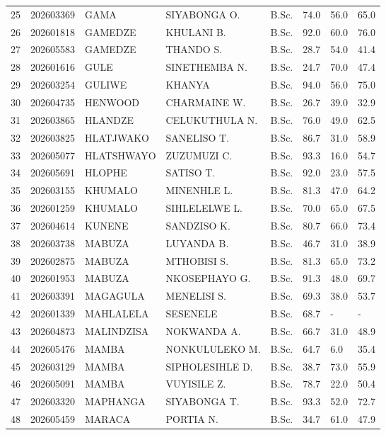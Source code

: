\documentclass[12pt]{article}
\begin{document}
\begin{longtable}{@{}llllllll@{}}
25 & 202603369 & GAMA & SIYABONGA O. & B.Sc. & 74.0 & 56.0 & 65.0 \\
26 & 202601818 & GAMEDZE & KHULANI B. & B.Sc. & 92.0 & 60.0 & 76.0 \\
27 & 202605583 & GAMEDZE & THANDO S. & B.Sc. & 28.7 & 54.0 & 41.4 \\
28 & 202601616 & GULE & SINETHEMBA N. & B.Sc. & 24.7 & 70.0 & 47.4 \\
29 & 202603254 & GULIWE & KHANYA & B.Sc. & 94.0 & 56.0 & 75.0 \\
30 & 202604735 & HENWOOD & CHARMAINE W. & B.Sc. & 26.7 & 39.0 & 32.9 \\
31 & 202603865 & HLANDZE & CELUKUTHULA N. & B.Sc. & 76.0 & 49.0 & 62.5 \\
32 & 202603825 & HLATJWAKO & SANELISO T. & B.Sc. & 86.7 & 31.0 & 58.9 \\
33 & 202605077 & HLATSHWAYO & ZUZUMUZI C. & B.Sc. & 93.3 & 16.0 & 54.7 \\
34 & 202605691 & HLOPHE & SATISO T. & B.Sc. & 92.0 & 23.0 & 57.5 \\
35 & 202603155 & KHUMALO & MINENHLE L. & B.Sc. & 81.3 & 47.0 & 64.2 \\
36 & 202601259 & KHUMALO & SIHLELELWE L. & B.Sc. & 70.0 & 65.0 & 67.5 \\
37 & 202604614 & KUNENE & SANDZISO K. & B.Sc. & 80.7 & 66.0 & 73.4 \\
38 & 202603738 & MABUZA & LUYANDA B. & B.Sc. & 46.7 & 31.0 & 38.9 \\
39 & 202602875 & MABUZA & MTHOBISI S. & B.Sc. & 81.3 & 65.0 & 73.2 \\
40 & 202601953 & MABUZA & NKOSEPHAYO G. & B.Sc. & 91.3 & 48.0 & 69.7 \\
41 & 202603391 & MAGAGULA & MENELISI S. & B.Sc. & 69.3 & 38.0 & 53.7 \\
42 & 202601339 & MAHLALELA & SESENELE & B.Sc. & 68.7 & - & - \\
43 & 202604873 & MALINDZISA & NOKWANDA A. & B.Sc. & 66.7 & 31.0 & 48.9 \\
44 & 202605476 & MAMBA & NONKULULEKO M. & B.Sc. & 64.7 & 6.0 & 35.4 \\
45 & 202603129 & MAMBA & SIPHOLESIHLE D. & B.Sc. & 38.7 & 73.0 & 55.9 \\
46 & 202605091 & MAMBA & VUYISILE Z. & B.Sc. & 78.7 & 22.0 & 50.4 \\
47 & 202603320 & MAPHANGA & SIYABONGA T. & B.Sc. & 93.3 & 52.0 & 72.7 \\
48 & 202605459 & MARACA & PORTIA N. & B.Sc. & 34.7 & 61.0 & 47.9 \\

\end{longtable}
\end{document}
